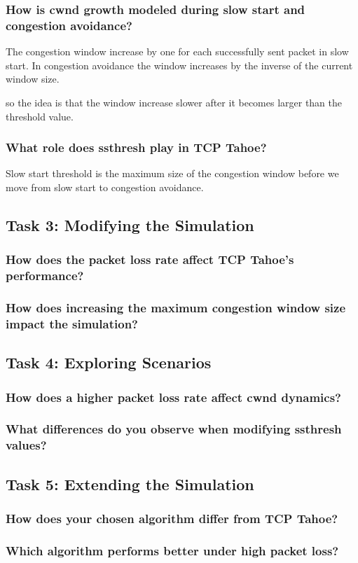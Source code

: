 \documentclass{article}
\begin{document}
\subsubsection{How is cwnd growth modeled during slow start and congestion avoidance?}
The congestion window increase by one for each successfully sent packet in slow start. 
In congestion avoidance the window increases by the inverse of the current window size. 

so the idea is that the window increase slower after it becomes larger than the threshold value.

\subsubsection{What role does ssthresh play in TCP Tahoe?}
Slow start threshold is the maximum size of the congestion window before we move from slow start to congestion avoidance.


\subsection{Task 3: Modifying the Simulation}

\subsubsection{How does the packet loss rate affect TCP Tahoe’s performance?}

\subsubsection{How does increasing the maximum congestion window size impact the simulation?}


\subsection{Task 4: Exploring Scenarios}

\subsubsection{How does a higher packet loss rate affect cwnd dynamics?}

\subsubsection{What differences do you observe when modifying ssthresh values?}


\subsection{Task 5: Extending the Simulation}

\subsubsection{How does your chosen algorithm differ from TCP Tahoe?}

\subsubsection{Which algorithm performs better under high packet loss?}
\end{document}
